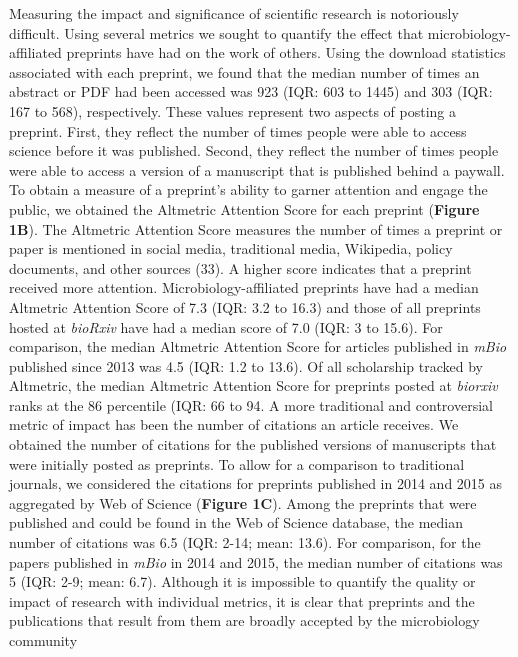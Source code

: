 \documentclass[11pt,]{article}
\begin{document}
Measuring the impact and significance of scientific research is
notoriously difficult. Using several metrics we sought to quantify the
effect that microbiology-affiliated preprints have had on the work of
others. Using the download statistics associated with each preprint, we
found that the median number of times an abstract or PDF had been
accessed was 923 (IQR: 603 to 1445) and 303 (IQR: 167 to 568),
respectively. These values represent two aspects of posting a preprint.
First, they reflect the number of times people were able to access
science before it was published. Second, they reflect the number of
times people were able to access a version of a manuscript that is
published behind a paywall. To obtain a measure of a preprint's ability
to garner attention and engage the public, we obtained the Altmetric
Attention Score for each preprint (\textbf{Figure 1B}). The Altmetric
Attention Score measures the number of times a preprint or paper is
mentioned in social media, traditional media, Wikipedia, policy
documents, and other sources (33). A higher score indicates that a
preprint received more attention. Microbiology-affiliated preprints have
had a median Altmetric Attention Score of 7.3 (IQR: 3.2 to 16.3) and
those of all preprints hosted at \emph{bioRxiv} have had a median score
of 7.0 (IQR: 3 to 15.6). For comparison, the median Altmetric Attention
Score for articles published in \emph{mBio} published since 2013 was 4.5
(IQR: 1.2 to 13.6). Of all scholarship tracked by Altmetric, the median
Altmetric Attention Score for preprints posted at \emph{biorxiv} ranks
at the 86 percentile (IQR: 66 to 94. A more traditional and
controversial metric of impact has been the number of citations an
article receives. We obtained the number of citations for the published
versions of manuscripts that were initially posted as preprints. To
allow for a comparison to traditional journals, we considered the
citations for preprints published in 2014 and 2015 as aggregated by Web
of Science (\textbf{Figure 1C}). Among the preprints that were published
and could be found in the Web of Science database, the median number of
citations was 6.5 (IQR: 2-14; mean: 13.6). For comparison, for the
papers published in \emph{mBio} in 2014 and 2015, the median number of
citations was 5 (IQR: 2-9; mean: 6.7). Although it is impossible to
quantify the quality or impact of research with individual metrics, it
is clear that preprints and the publications that result from them are
broadly accepted by the microbiology community
\end{document}
